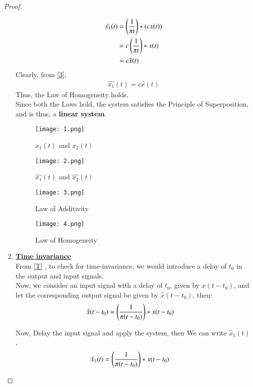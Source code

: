 \documentclass[journal,12pt,twocolumn]{IEEEtran}
\begin{document}
\begin{proof}
\begin{enumerate}
\begin{align}
    \hat{x_1}(t) &= \left(\frac{1}{\pi t}\right)\ast (cx(t))\\
    &= c\left(\frac{1}{\pi t}\right)\ast x(t)\\
     &= c\hat{x}(t)
     \label{3}
\end{align}
Clearly, from \eqref{3},
\begin{align}
    \hat{x_1}(t) = c\hat{x}(t)
\end{align}
Thus, the Law of Homogeneity holds.\\
Since both the Laws hold, the system satisfies the Principle of Superposition, and is thus, a \textbf{linear system}.

 \begin{figure}[!htp]
\centering
 \texttt{[image: 1.png]}
 \caption{$x_1(t)$ and $x_2(t)$}
 \end{figure}
 
  \begin{figure}[!htp]
\centering
 \texttt{[image: 2.png]}
 \caption{$\hat{x_1}(t)$ and $\hat{x_2}(t)$}
 \label{fig2}
 \end{figure}
 
  \begin{figure}[!htp]
\centering
 \texttt{[image: 3.png]}
 \caption{Law of Additivity}
 \end{figure}
 
  \begin{figure}[!htp]
\centering
 \texttt{[image: 4.png]}
 \caption{Law of Homogeneity}
 \end{figure}


\item \textbf{\underline{Time invariance}}\\
From \eqref{T} , to check for time-invariance, we would introduce a delay of $t_0$ in the output and input signals.\\
Now, we consider an input signal with a delay of $t_0$, given by $x(t-t_0)$, and let the corresponding output signal be given by $\hat{x}(t-t_0)$, then:
\begin{align}
    \hat{x}(t-t_0) &=\left(\frac{1}{\pi (t-t_0)}\right)\ast x(t-t_0)\label{01}
\end{align}

Now, Delay the input signal and apply the system, then 
We can write $\hat{x}_1(t)$,
\begin{align}
\hat{x}_1(t)
    &= \left(\frac{1}{\pi (t-t_0)}\right)\ast x(t-t_0)\label{00}
\end{align}


\end{enumerate}
\end{proof}
\end{document}
